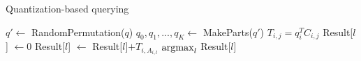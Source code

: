 \begin{algorithm}
	\caption{Quantization-based querying}
	\begin{algorithmic}
		\State $q' \gets$ RandomPermutation($q$)
		\State $q_0, q_1, ..., q_K \gets$ MakeParts($q'$)
				\State $T_{i,j} = q_i^T C_{i,j}$
			\EndFor
		\EndFor
			\State Result[$l$] $\gets 0$
				\State Result[$l$] $\gets$ Result[$l$]$+ T_{i,A_{i,l}}$
			\EndFor
		\EndFor
		\State \Return $\operatorname*{argmax}_{l}$ Result[$l$]
	\end{algorithmic}
\end{algorithm}
